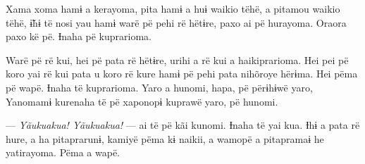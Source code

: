 Xama xoma hamɨ a kerayoma, pita hamɨ a huɨ waikio tëhë, a pitamou waikio
 tëhë, ɨ̃hɨ të nosi yau hamɨ warë pë pehi rë hëtɨre, paxo ai pë hurayoma.
 Oraora paxo kë pë. Ɨnaha pë kuprarioma. 

Warë pë rë kui, hei pë pata rë hëtɨre, urihi a rë kui a haikiprarioma.
Hei pei pë koro yai rë kui pata u koro rë kure hamɨ pë pehi pata
nihõroye hërɨma. Hei pëma pë wapë. Ɨnaha të kuprarioma. Yaro a hunomi,
hapa, pë përɨhɨwë yaro, Yanomamɨ kurenaha të pë xaponopɨ kuprawë yaro,
pë hunomi. 

--- \textit{Yãukuakua! Yãukuakua!} --- ai të pë kãi kunomi. Ɨnaha të yai kua. Ɨhɨ a
pata rë hure, a ha pitaprarunɨ, kamiyë pëma kɨ naikii, a wamopë a
pitapramaɨ he yatirayoma. Pëma a wapë. 
